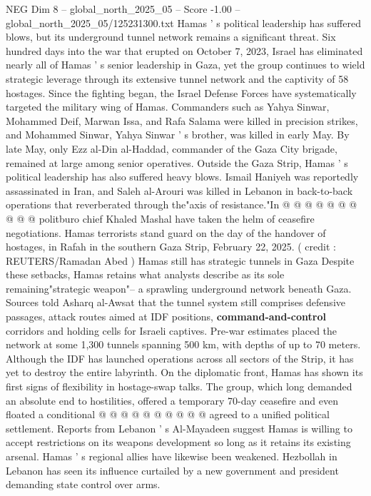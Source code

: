 \begin{textsample}{NEG Dim 8 – global\_north\_2025\_05 – Score -1.00 – global\_north\_2025\_05/125231300.txt}  \label{ex:f8_neg_410}
Hamas ' s political leadership has suffered blows, but its underground tunnel network remains a significant threat.
Six hundred days into the war that erupted on October 7, 2023, Israel has eliminated nearly all of Hamas ' s senior leadership in Gaza, yet the group continues to wield strategic leverage through its extensive tunnel network and the captivity of 58 hostages.
Since the fighting began, the Israel Defense Forces have systematically targeted the military wing of Hamas.
Commanders such as Yahya Sinwar, Mohammed Deif, Marwan Issa, and Rafa Salama were killed in precision strikes, and Mohammed Sinwar, Yahya Sinwar ' s brother, was killed in early May.
By late May, only Ezz al-Din al-Haddad, commander of the Gaza City brigade, remained at large among senior operatives.
Outside the Gaza Strip, Hamas ' s political leadership has also suffered heavy blows.
Ismail Haniyeh was reportedly assassinated in Iran, and Saleh al-Arouri was killed in Lebanon in back-to-back operations that reverberated through the"axis of resistance."In @ @ @ @ @ @ @ @ @ @ politburo chief Khaled Mashal have taken the helm of ceasefire negotiations.
Hamas terrorists stand guard on the day of the handover of hostages, in Rafah in the southern Gaza Strip, February 22, 2025. ( credit : REUTERS/Ramadan Abed ) Hamas still has strategic tunnels in Gaza Despite these setbacks, Hamas retains what analysts describe as its sole remaining"strategic weapon"-- a sprawling underground network beneath Gaza.
Sources told Asharq al-Awsat that the tunnel system still comprises defensive passages, attack routes aimed at IDF positions, \textbf{command-and-control} corridors and holding cells for Israeli captives.
Pre-war estimates placed the network at some 1,300 tunnels spanning 500 km, with depths of up to 70 meters.
Although the IDF has launched operations across all sectors of the Strip, it has yet to destroy the entire labyrinth.
On the diplomatic front, Hamas has shown its first signs of flexibility in hostage-swap talks.
The group, which long demanded an absolute end to hostilities, offered a temporary 70-day ceasefire and even floated a conditional @ @ @ @ @ @ @ @ @ @ agreed to a unified political settlement.
Reports from Lebanon ' s Al-Mayadeen suggest Hamas is willing to accept restrictions on its weapons development so long as it retains its existing arsenal.
Hamas ' s regional allies have likewise been weakened.
Hezbollah in Lebanon has seen its influence curtailed by a new government and president demanding state control over arms.

\end{textsample}
